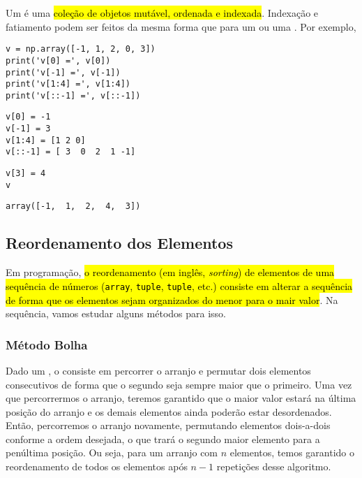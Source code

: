 Um {\PYTHONnumpyDOTarray} é uma \hl{coleção de objetos mutável, ordenada e indexada}. Indexação e fatiamento podem ser feitos da mesma forma que para um {\PYTHONtuple} ou uma {\PYTHONlist}. Por exemplo,

\begin{lstlisting}
v = np.array([-1, 1, 2, 0, 3])
print('v[0] =', v[0])
print('v[-1] =', v[-1])
print('v[1:4] =', v[1:4])
print('v[::-1] =', v[::-1])
\end{lstlisting}

\begin{verbatim}
v[0] = -1
v[-1] = 3
v[1:4] = [1 2 0]
v[::-1] = [ 3  0  2  1 -1]
\end{verbatim}

\begin{lstlisting}
v[3] = 4
v
\end{lstlisting}

\begin{verbatim}
array([-1,  1,  2,  4,  3])
\end{verbatim}


\subsection{Reordenamento dos Elementos}

Em programação, \hl{o reordenamento (em inglês, \textit{sorting}) de elementos de uma sequência de números (\texttt{array}, \texttt{tuple}, \texttt{tuple}, etc.) consiste em alterar a sequência de forma que os elementos sejam organizados do menor para o mair valor}. Na sequência, vamos estudar alguns métodos para isso.

\subsubsection{Método Bolha}

Dado um {\PYTHONnumpyDOTarray}, o  consiste em percorrer o arranjo e permutar dois elementos consecutivos de forma que o segundo seja sempre maior que o primeiro. Uma vez que percorrermos o arranjo, teremos garantido que o maior valor estará na última posição do arranjo e os demais elementos ainda poderão estar desordenados. Então, percorremos o arranjo novamente, permutando elementos dois-a-dois conforme a ordem desejada, o que trará o segundo maior elemento para a penúltima posição. Ou seja, {para um arranjo com $n$ elementos, temos garantido o reordenamento de todos os elementos após $n-1$ repetições desse algoritmo}.

